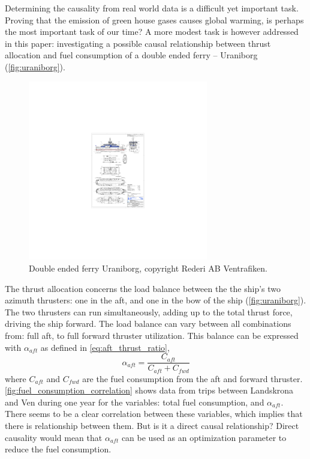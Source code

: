 \documentclass[fleqn,10pt]{olplainarticle}
\begin{document}
Determining the causality from real world data is a difficult yet important task. Proving that the emission of green house gases causes global warming, is perhaps the most important task of our time? A more modest task is however addressed in this paper: investigating a possible causal relationship between thrust allocation and fuel consumption of a double ended ferry -- Uraniborg (\autoref{fig:uraniborg}).  
\begin{figure}[!htb]
    \centering
    \includegraphics[width=0.7\textwidth]{figures/GA_uraniborg.pdf}
    \caption{Double ended ferry Uraniborg, copyright Rederi AB Ventrafiken.}
    \label{fig:uraniborg}
\end{figure}
The thrust allocation concerns the load balance between the the ship's two azimuth thrusters: one in the aft, and one in the bow of the ship (\autoref{fig:uraniborg}). The two thrusters can run simultaneously, adding up to the total thrust force, driving the ship forward. The load balance can vary between all combinations from: full aft, to full forward thruster utilization. This balance can be expressed with $\alpha_{aft}$ as defined in \autoref{eq:aft_thrust_ratio},  
\begin{equation}
    \alpha_{aft} = \frac{C_{aft}}{C_{aft} + C_{fwd}}
    \label{eq:aft_thrust_ratio}
\end{equation}
where $C_{aft}$ and $C_{fwd}$ are the fuel consumption from the aft and forward thruster. 
\autoref{fig:fuel_consumption_correlation} shows data from trips between Landskrona and Ven during one year for the variables: total fuel consumption, and $\alpha_{aft}$. There seems to be a clear correlation between these variables,  which implies that there is relationship between them. But is it a direct causal relationship? Direct causality would mean that $\alpha_{aft}$ can be used as an optimization parameter to reduce the fuel consumption.
\end{document}
